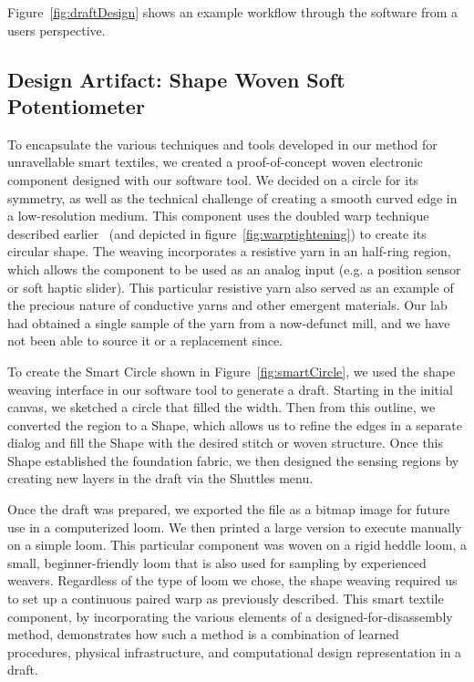 Figure~\ref{fig:draftDesign} shows an example workflow through the software from a users perspective.

\subsection{Design Artifact: Shape Woven Soft Potentiometer}

To encapsulate the various techniques and tools developed in our method for unravellable smart textiles, we created a proof-of-concept woven electronic component designed with our software tool. We decided on a circle for its symmetry, as well as the technical challenge of creating a smooth curved edge in a low-resolution medium. This component uses the doubled warp technique described earlier ~{(and depicted in figure~\ref{fig:warptightening})} to create its circular shape. The weaving incorporates a resistive yarn in an half-ring region, which allows the component to be used as an analog input (e.g. a position sensor or soft haptic slider). This particular resistive yarn also served as an example of the precious nature of conductive yarns and other emergent materials. Our lab had obtained a single sample of the yarn from a now-defunct mill, and we have not been able to source it or a replacement since.

To create the Smart Circle shown in Figure~\ref{fig:smartCircle}, we used the shape weaving interface in our software tool to generate a draft. Starting in the initial canvas, we sketched a circle that filled the width. Then from this outline, we converted the region to a Shape, which allows us to refine the edges in a separate dialog and fill the Shape with the desired stitch or woven structure. Once this Shape established the foundation fabric, we then designed the sensing regions by creating new layers in the draft via the Shuttles menu. 

Once the draft was prepared, we exported the file as a bitmap image for future use in a computerized loom. We then printed a large version to execute manually on a simple loom. This particular component was woven on a rigid heddle loom, a small, beginner-friendly loom that is also used for sampling by experienced weavers. Regardless of the type of loom we chose, the shape weaving required us to set up a continuous paired warp as previously described. This smart textile component, by incorporating the various elements of a designed-for-disassembly method, demonstrates how such a method is a combination of learned procedures, physical infrastructure, and computational design representation in a draft. 

